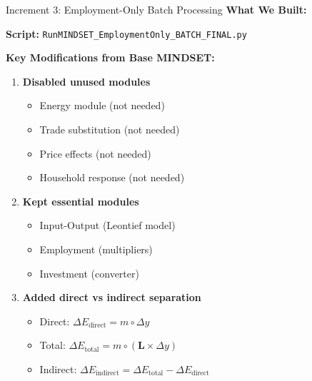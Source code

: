\documentclass[10pt]{beamer}
\begin{document}
\begin{frame}{Increment 3: Employment-Only Batch Processing}
\textbf{What We Built:}

\vspace{0.3cm}

\textbf{Script:} \texttt{RunMINDSET\_EmploymentOnly\_BATCH\_FINAL.py}

\vspace{0.2cm}

\textbf{Key Modifications from Base MINDSET:}

\vspace{0.2cm}

\begin{enumerate}
    \item \textbf{Disabled unused modules}
    \begin{itemize}
        \item Energy module (not needed)
        \item Trade substitution (not needed)
        \item Price effects (not needed)
        \item Household response (not needed)
    \end{itemize}

    \vspace{0.2cm}

    \item \textbf{Kept essential modules}
    \begin{itemize}
        \item Input-Output (Leontief model)
        \item Employment (multipliers)
        \item Investment (converter)
    \end{itemize}

    \vspace{0.2cm}

    \item \textbf{Added direct vs indirect separation}
    \begin{itemize}
        \item Direct: $\Delta E_{\text{direct}} = m \circ \Delta y$
        \item Total: $\Delta E_{\text{total}} = m \circ (\mathbf{L} \times \Delta y)$
        \item Indirect: $\Delta E_{\text{indirect}} = \Delta E_{\text{total}} - \Delta E_{\text{direct}}$
    \end{itemize}
\end{enumerate}

\end{frame}
\end{document}
